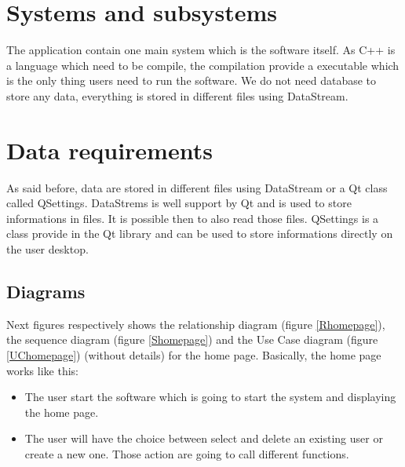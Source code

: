 \section{Systems and subsystems}
The application contain one main system which is the software itself. As C++ is a language which need to be compile, the compilation provide a executable which is the only thing users need to run the software.
We do not need database to store any data, everything is stored in different files using DataStream.  

\section{Data requirements}
As said before, data are stored in different files using DataStream or a Qt class called QSettings. DataStrems is well support by Qt and is used to store informations in files. It is possible then to also read those files. QSettings is a class provide in the Qt library and can be used to store informations directly on the user desktop.

\subsection{Diagrams}
Next figures respectively shows the relationship diagram (figure \ref{Rhomepage}), the sequence diagram (figure \ref{Shomepage}) and the Use Case diagram (figure \ref{UChomepage}) (without details) for the home page. Basically, the home page works like this:
\begin{itemize}
\item The user start the software which is going to start the system and displaying the home page.
\item The user will have the choice between select and delete an existing user or create a new one. Those action are going to call different functions.
\end{itemize}

